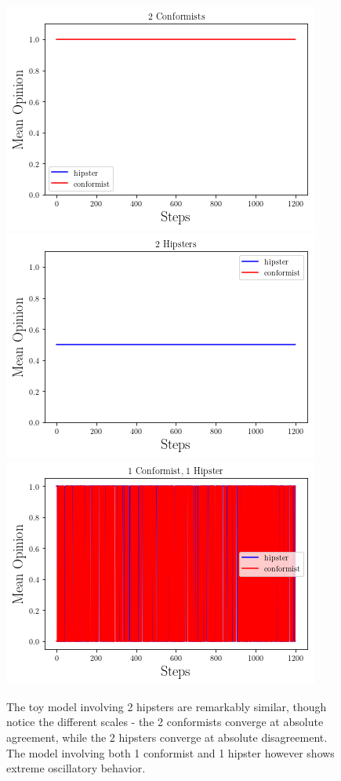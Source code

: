 \documentclass{article}
\begin{document}
\begin{figure}[h]
\centering
\includegraphics[scale = 0.6]{2conformists.png}
\includegraphics[scale = 0.6]{2hipsters.png}
\includegraphics[scale = 0.6]{1ofeach.png}
\caption{The toy model involving 2 hipsters are remarkably similar, though notice the different scales - the 2 conformists converge at absolute agreement, while the 2 hipsters converge at absolute disagreement. The model involving both 1 conformist and 1 hipster however shows extreme oscillatory behavior.}
\end{figure}
\end{document}
